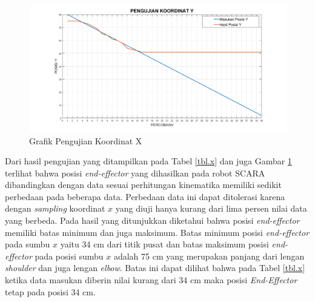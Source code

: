 	\begin{figure}[H]
	\centering
	\includegraphics[width=12cm]{gambar/px.png}
	\caption{Grafik Pengujian Koordinat X}
	\label{pic.koordinatx}
\end{figure}

Dari hasil pengujian yang ditampilkan pada Tabel \ref{tbl.x} dan juga Gambar \ref{pic.koordinatx} terlihat bahwa posisi \textit{end-effector} yang dihasilkan pada robot SCARA dibandingkan dengan data sesuai perhitungan kinematika memiliki sedikit perbedaan pada beberapa data. Perbedaan data ini dapat ditolerasi karena dengan \textit{sampling} koordinat $x$ yang diuji hanya kurang dari lima persen nilai data yang berbeda. Pada hasil yang ditunjukkan diketahui bahwa posisi \textit{end-effector} memiliki batas minimum dan juga maksimum. Batas minimum posisi \textit{end-effector} pada sumbu $x$ yaitu 34 cm dari titik pusat dan batas maksimum posisi \textit{end-effector} pada posisi sumbu $x$ adalah 75 cm yang merupakan panjang dari lengan \textit{shoulder} dan juga lengan \textit{elbow}. Batas ini dapat dilihat bahwa pada Tabel \ref{tbl.x} ketika data masukan diberin nilai kurang dari 34 cm maka posisi \textit{End-Effector} tetap pada posisi 34 cm.

